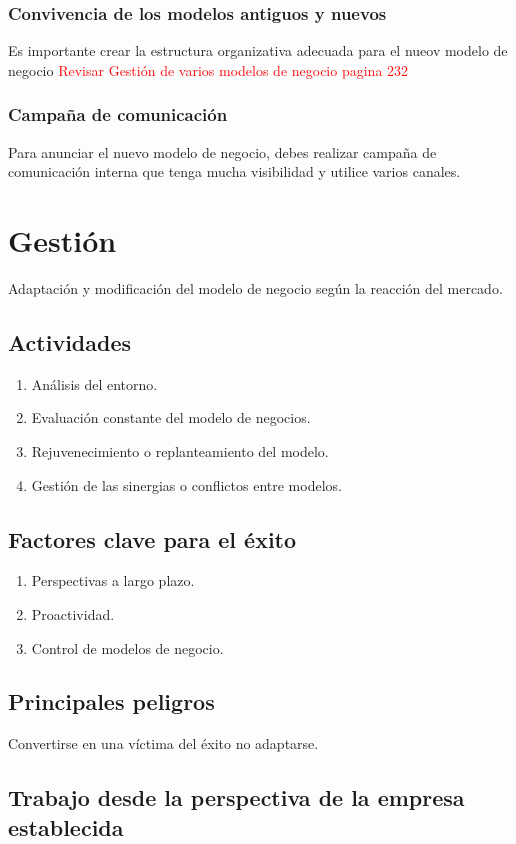 \documentclass[11pt]{book}
\begin{document}
\subsubsection{Convivencia de los modelos antiguos y nuevos}
Es importante crear la estructura organizativa adecuada para el nueov modelo de negocio \textcolor{red}{Revisar Gestión de varios modelos de negocio pagina 232}
\subsubsection{Campaña de comunicación}
Para anunciar el nuevo modelo de negocio, debes realizar campaña de comunicación interna que tenga mucha visibilidad y utilice varios canales.
\section{Gestión}
Adaptación y modificación del modelo de negocio según la reacción del mercado.
\subsection{Actividades}
\begin{enumerate}
\item Análisis del entorno.
\item Evaluación constante del modelo de negocios.
\item Rejuvenecimiento o replanteamiento del modelo.
\item Gestión de las sinergias o conflictos entre modelos.
\end{enumerate}
\subsection{Factores clave para el éxito}
\begin{enumerate}
\item Perspectivas a largo plazo.
\item Proactividad.
\item Control de modelos de negocio.
\end{enumerate}
\subsection{Principales peligros}
Convertirse en una víctima del éxito no adaptarse.
\subsection{Trabajo desde la perspectiva de la empresa establecida}
\end{document}
